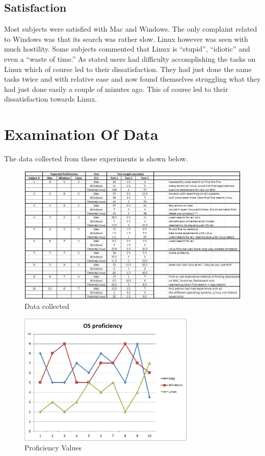 \documentclass[11pt]{article}
\begin{document}
\subsection{Satisfaction}
Most subjects were satisfied with Mac and Windows. The only complaint related to Windows was that its search was rather slow. Linux however was seen with much hostility. Some subjects commented that Linux is “stupid”, “idiotic” and even a “waste of time.” As stated users had difficulty accomplishing the tasks on Linux which of course led to their dissatisfaction. They had just done the same tasks twice and with relative ease and now found themselves struggling what they had just done easily a couple of minutes ago. This of course led to their dissatisfaction towards Linux.

\section{Examination Of Data}
The data collected from these experiments is shown below.

\begin{figure}[h!]
  \centering
    \includegraphics[width= 1\textwidth]{./Images/Data_table}
  \caption{Data collected}
 \label{Collect}
\end{figure}

\begin{figure}[h!]
  \centering
    \includegraphics[width=0.75\textwidth]{./Images/Proficiency}
  \caption{Proficiency Values}
 \label{Proficiency}
\end{figure}
\end{document}
